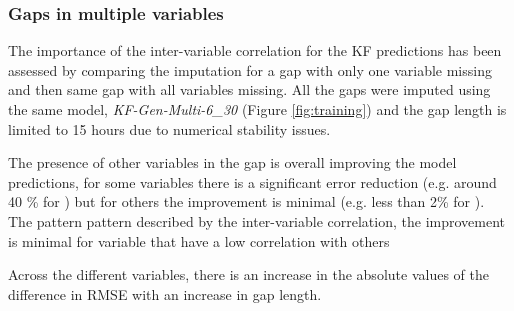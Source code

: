 \documentclass{article}
\begin{document}
\subsubsection{Gaps in multiple variables}

The importance of the inter-variable correlation for the KF predictions has been assessed by comparing the imputation for a gap with only one variable missing and then same gap with all variables missing. All the gaps were imputed using the same model, \textit{KF-Gen-Multi-6\_30} (Figure \ref{fig:training}) and the gap length is limited to 15 hours due to numerical stability issues.

The presence of other variables in the gap is overall improving the model predictions, for some variables there is a significant error reduction (e.g. around 40 \% for ) but for others the improvement is minimal (e.g. less than 2\% for ). The pattern  pattern described by the inter-variable correlation, the improvement is minimal for variable that have a low correlation with others 

Across the different variables, there is an increase in the absolute values of the difference in RMSE with an increase in gap length.
\end{document}
